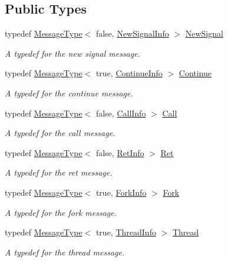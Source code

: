 \subsection*{Public Types}
\begin{DoxyCompactItemize}
\item 
typedef \hyperlink{struct_message_1_1_message_type}{Message\+Type}$<$ false, \hyperlink{struct_message_1_1_new_signal_info}{New\+Signal\+Info} $>$ \hyperlink{class_message_a9f57a1ee0e722668e9101b737d7c9844}{New\+Signal}
\begin{DoxyCompactList}\small\item\em A typedef for the new signal message. \end{DoxyCompactList}\item 
typedef \hyperlink{struct_message_1_1_message_type}{Message\+Type}$<$ true, \hyperlink{struct_message_1_1_continue_info}{Continue\+Info} $>$ \hyperlink{class_message_a04de61b84a209cdf372b6f53f3adf7c4}{Continue}
\begin{DoxyCompactList}\small\item\em A typedef for the continue message. \end{DoxyCompactList}\item 
typedef \hyperlink{struct_message_1_1_message_type}{Message\+Type}$<$ false, \hyperlink{struct_message_1_1_call_info}{Call\+Info} $>$ \hyperlink{class_message_a0fd0ed431cb0d672045d09368a5d2126}{Call}
\begin{DoxyCompactList}\small\item\em A typedef for the call message. \end{DoxyCompactList}\item 
typedef \hyperlink{struct_message_1_1_message_type}{Message\+Type}$<$ false, \hyperlink{struct_message_1_1_ret_info}{Ret\+Info} $>$ \hyperlink{class_message_a146628035f5a0723cb04f7a328858e34}{Ret}
\begin{DoxyCompactList}\small\item\em A typedef for the ret message. \end{DoxyCompactList}\item 
typedef \hyperlink{struct_message_1_1_message_type}{Message\+Type}$<$ true, \hyperlink{struct_message_1_1_fork_info}{Fork\+Info} $>$ \hyperlink{class_message_ad1eca09e5cd0c92f940f51b847dd7f14}{Fork}
\begin{DoxyCompactList}\small\item\em A typedef for the fork message. \end{DoxyCompactList}\item 
typedef \hyperlink{struct_message_1_1_message_type}{Message\+Type}$<$ true, \hyperlink{struct_message_1_1_thread_info}{Thread\+Info} $>$ \hyperlink{class_message_ad3f3fae0323770c88017fc75b50682d1}{Thread}
\begin{DoxyCompactList}\small\item\em A typedef for the thread message. \end{DoxyCompactList}\end{DoxyCompactItemize}
